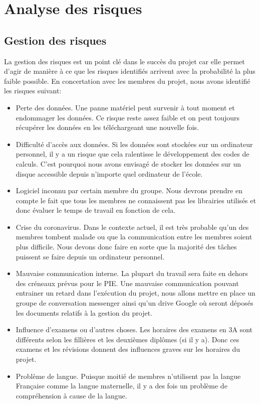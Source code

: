 \chapter*{Analyse des risques}
\label{sec:risques}
\section*{Gestion des risques}
La gestion des risques est un point clé dans le succès du projet car elle permet d'agir de manière à ce que les risques identifiés arrivent avec la probabilité la plus faible possible. En concertation avec les membres du projet, nous avons identifié les risques suivant:

\begin{itemize}
	\item Perte des données. Une panne matériel peut survenir à tout moment et endommager les données. Ce risque reste assez faible et on peut toujours récupérer les données en les téléchargeant une nouvelle fois.
	
	\item Difficulté d'accès aux données. Si les données sont stockées sur un ordinateur personnel, il y a un risque que cela ralentisse le développement des codes de calculs. C'est pourquoi nous avons envisagé de stocker les données sur un disque accessible depuis n'importe quel ordinateur de l'école.
	
	\item Logiciel inconnu par certain membre du groupe. Nous devrons prendre en compte le fait que tous les membres ne connaissent pas les librairies utilisés et donc évaluer le temps de travail en fonction de cela.
	
	\item Crise du coronavirus. Dans le contexte actuel, il est très probable qu'un des membres tombent malade ou que la communication entre les membres soient plus difficile. Nous devons donc faire en sorte que la majorité des tâches puissent se faire depuis un ordinateur personnel.
	
	\item Mauvaise communication interne. La plupart du travail sera faite en dehors des créneaux prévus pour le PIE. Une mauvaise communication pouvant entrainer un retard dans l'exécution du projet, nous allons mettre en place un groupe de conversation messenger ainsi qu'un drive Google où seront déposés les documents relatifs à la gestion du projet.
	
	\item Influence d'examens ou d'autres choses. Les horaires des examens en 3A sont différents selon les fillières et les deuxièmes diplômes (si il y a). Donc ces examens et les révisions donnent des influences graves sur les horaires du projet.
	
	\item Problème de langue. Puisque moitié de membres n'utilisent pas la langue Française comme la langue maternelle, il y a des fois un problème de compréhension à cause de la langue.
	
	
\end{itemize}

